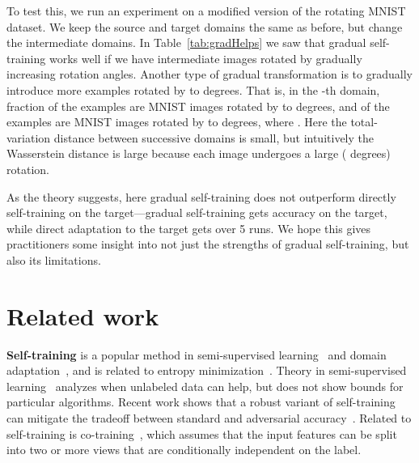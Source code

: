 \documentclass[11pt]{article}
\begin{document}
To test this, we run an experiment on a modified version of the rotating MNIST dataset.
We keep the source and target domains the same as before, but change the intermediate domains.
In Table~\ref{tab:gradHelps} we saw that gradual self-training works well if we have intermediate images rotated by gradually increasing rotation angles.
Another type of gradual transformation is to gradually introduce more examples rotated by  to  degrees.
That is, in the -th domain,  fraction of the examples are MNIST images rotated by  to  degrees, and  of the examples are MNIST images rotated by  to  degrees, where .
Here the total-variation distance between successive domains is small, but intuitively the Wasserstein distance is large because each image undergoes a large ( degrees) rotation.

As the theory suggests, here gradual self-training does not outperform directly self-training on the target---gradual self-training gets  accuracy on the target, while direct adaptation to the target gets  over 5 runs.
We hope this gives practitioners some insight into not just the strengths of gradual self-training, but also its limitations.
 
\section{Related work}
\label{sec:related_work}

\textbf{Self-training} is a popular method in semi-supervised learning~\cite{lee2013pseudo, sohn2020fixmatch} and domain adaptation~\cite{long2013transfer, zou2019confidence, inoue2018cross}, and is related to entropy minimization~\cite{grandvalet05entropy}. Theory in semi-supervised learning~\cite{rigollet2007generalization, singh2008unlabeled, shai2008unlabeled} analyzes when unlabeled data can help, but does not show bounds for particular algorithms. Recent work shows that a robust variant of self-training can mitigate the tradeoff between standard and adversarial accuracy~\cite{raghunathan2020understanding}. Related to self-training is co-training~\cite{blum98cotraining}, which assumes that the input features can be split into two or more views that are conditionally independent on the label.
\end{document}
